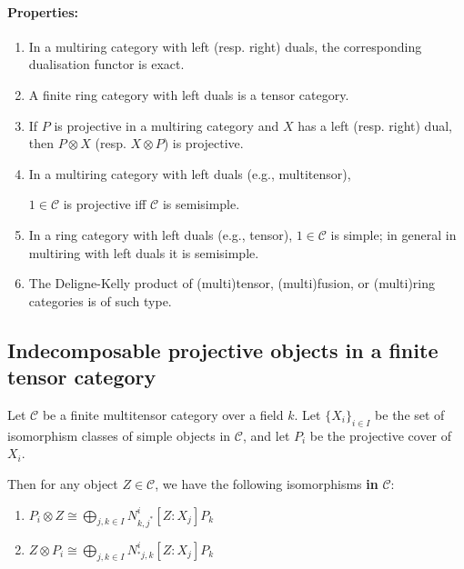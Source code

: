 \documentclass[11pt]{article}
\theoremstyle{definition}
\begin{document}
\paragraph{Properties:}
\begin{enumerate}
  \item In a multiring category with left (resp. right) duals, the corresponding dualisation functor is exact.
  \item A finite ring category with left duals is a tensor category.
  \item If \( P \) is projective in a multiring category and \( X \) has a left (resp. right) dual, then \( P \otimes X \) (resp. \( X \otimes P \)) is projective.
  \item In a multiring category with left duals (e.g., multitensor), 
  \begin{center}

      \( 1 \in \mathcal{C} \) is projective iff \( \mathcal{C} \) is semisimple.

  \end{center}
  \item In a ring category with left duals (e.g., tensor), \( 1 \in \mathcal{C} \) is simple; in general in multiring with left duals it is semisimple.
  \item The Deligne-Kelly product of (multi)tensor, (multi)fusion, or (multi)ring categories is of such type.
\end{enumerate}






\subsection{Indecomposable projective objects in a finite tensor category}
Let \( \mathcal{C} \) be a finite multitensor category over a field \( k \). Let \( \{X_i\}_{i \in I} \) be the set of isomorphism classes of simple objects in \( \mathcal{C} \), and let \( P_i \) be the projective cover of \( X_i \).

Then for any object \( Z \in \mathcal{C} \), we have the following isomorphisms \textbf{in} \( \mathcal{C} \):
\begin{enumerate}
    \item \( P_i \otimes Z \cong \bigoplus_{j,k \in I} N_{k,j^*}^i [Z:X_j] P_k \)
    \item \( Z \otimes P_i \cong \bigoplus_{j,k \in I} N_{{}^*j,k}^i [Z:X_j] P_k \)
\end{enumerate}
\end{document}
